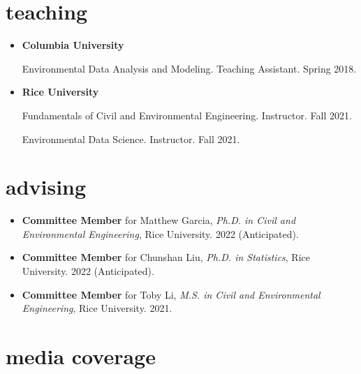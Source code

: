 \documentclass[10pt,oneside]{article}
\begin{document}

\section{teaching}

\mbox{}\vspace{-\dimexpr\baselineskip\relax}


\begin{itemize}[label={}]
  
  \item \textbf{Columbia University}
        
        Environmental Data Analysis and Modeling. Teaching Assistant. Spring 2018.
        
        
  \item \textbf{Rice University}
        
        Fundamentals of Civil and Environmental Engineering. Instructor. Fall 2021.
        
        Environmental Data Science. Instructor. Fall 2021.
        
        
\end{itemize}


\section{advising}

\mbox{}\vspace{-\dimexpr\baselineskip\relax}


\begin{itemize}[label={}]
  
  \item \textbf{Committee Member} for Matthew Garcia, \textit{Ph.D. in Civil and Environmental Engineering}, Rice University. 2022 (Anticipated).
        
  \item \textbf{Committee Member} for Chunshan Liu, \textit{Ph.D. in Statistics}, Rice University. 2022 (Anticipated).
        
  \item \textbf{Committee Member} for Toby Li, \textit{M.S. in Civil and Environmental Engineering}, Rice University. 2021.
        
\end{itemize}


\section{media coverage}
\end{document}
